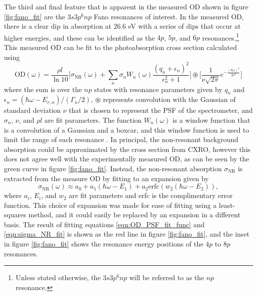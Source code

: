 The third and final feature that is apparent in the measured OD shown in figure \ref{fig:fano_fit} are the $3s3p^6np$ Fano resonances of interest.  In the measured OD, there is a clear dip in absorption at 26.6 eV with a series of dips that occur at higher energies, and these can be identified as the $4p$, $5p$, and $6p$ resonances.\footnote{Unless stated otherwise, the $3s3p^6np$ will be referred to as the $np$ resonance.} This measured OD can be fit to the photoabsorption cross section calculated using
\begin{equation}
\label{eqn:OD_PSF_fit_func}
	\mathrm{OD}(\omega) = \frac{\rho l}{\ln 10}\bigg[\sigma_{\mathrm{NR}}(\omega) + \sum_{n}\sigma_{n}W_{n}(\omega)\frac{(q_n + \epsilon_n)^2}{\epsilon_{n}^2 + 1}\bigg] \circledast \bigg[\frac{1}{\nu \sqrt{2\pi}}e^{-\frac{(\hbar\omega)^2}{2\nu^2}}\bigg]
\end{equation}
where the sum is over the $np$ states with resonance parameters given by $q_n$ and $\epsilon_{n}=(\hbar\omega-E_{r,n})/(\Gamma_n/2)$, $\circledast$ represents convolution with the Gaussian of standard deviation $\nu$ that is chosen to represent the PSF of the spectrometer, and $\sigma_{n}$, $\nu$, and $\rho l$ are fit parameters.  The function $W_{n}(\omega)$ is a window function that is a convolution of a Gaussian and a boxcar, and this window function is used to limit the range of each resonance \cite{chuTheoryUltrafastAutoionization2010, caretteMulticonfigurationalHartreeFockClosecoupling2013}. In principal, the non-resonant background absorption could be approximated by the cross section from CXRO, however this does not agree well with the experimentally measured OD, as can be seen by the green curve in figure \ref{fig:fano_fit}.  Instead, the non-resonant absorption $\sigma_{\mathrm{NR}}$ is extracted from the measure OD by fitting to an expansion given by
\begin{equation}
\label{eqn:sigma_NR_fit}
	\sigma_{\mathrm{NR}}(\omega) \approx a_0 + a_1(\hbar\omega - E_1) + a_2\mathrm{erfc}(w_2(\hbar\omega - E_2)),
\end{equation}
where $a_i$, $E_i$, and $w_2$ are fit parameters and erfc is the complimentary error function.  This choice of expansion was made for ease of fitting using a least-squares method, and it could easily be replaced by an expansion in a different basis.  The result of fitting equations \ref{eqn:OD_PSF_fit_func} and \ref{eqn:sigma_NR_fit} is shown as the red line in figure \ref{fig:fano_fit}, and the inset in figure \ref{fig:fano_fit} shows the resonance energy positions of the $4p$ to $8p$ resonances.

